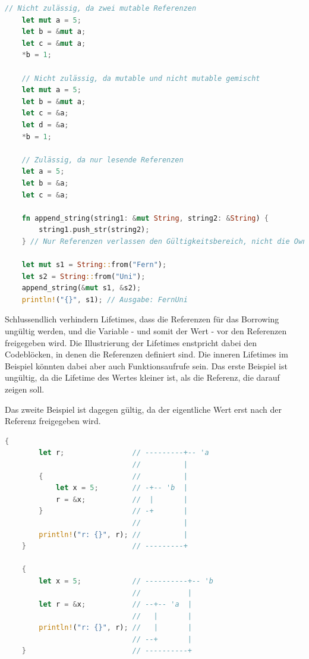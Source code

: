 \documentclass[11pt,a4paper, ngerman]{article}
\begin{document}
\begin{lstlisting}[language=rust, caption={borrowing}]
    // Nicht zulässig, da zwei mutable Referenzen
    let mut a = 5;
    let b = &mut a;
    let c = &mut a;
    *b = 1;

    // Nicht zulässig, da mutable und nicht mutable gemischt
    let mut a = 5;
    let b = &mut a;
    let c = &a;
    let d = &a;
    *b = 1;

    // Zulässig, da nur lesende Referenzen
    let a = 5;
    let b = &a;
    let c = &a;

    fn append_string(string1: &mut String, string2: &String) {
        string1.push_str(string2);
    } // Nur Referenzen verlassen den Gültigkeitsbereich, nicht die Owner!

    let mut s1 = String::from("Fern");
    let s2 = String::from("Uni");
    append_string(&mut s1, &s2);
    println!("{}", s1); // Ausgabe: FernUni
\end{lstlisting}

Schlussendlich verhindern Lifetimes, dass die Referenzen für das Borrowing ungültig werden, und die Variable - und somit der Wert - vor den Referenzen freigegeben wird. Die Illustrierung der Lifetimes enstpricht dabei den Codeblöcken, in denen die Referenzen definiert sind. Die inneren Lifetimes im Beispiel könnten dabei aber auch Funktionsaufrufe sein. Das erste Beispiel ist ungültig, da die Lifetime des Wertes kleiner ist, als die Referenz, die darauf zeigen soll.

Das zweite Beispiel ist dagegen gültig, da der eigentliche Wert erst nach der Referenz freigegeben wird.

\begin{lstlisting}[language=rust, caption={Lifetime Veranschaulichung \cite{LifetimeEx}}]
    {
        let r;                // ---------+-- 'a
                              //          |
        {                     //          |
            let x = 5;        // -+-- 'b  |
            r = &x;           //  |       |
        }                     // -+       |
                              //          |
        println!("r: {}", r); //          |
    }                         // ---------+

    {
        let x = 5;            // ----------+-- 'b
                              //           |
        let r = &x;           // --+-- 'a  |
                              //   |       |
        println!("r: {}", r); //   |       |
                              // --+       |
    }                         // ----------+
\end{lstlisting}
\end{document}
